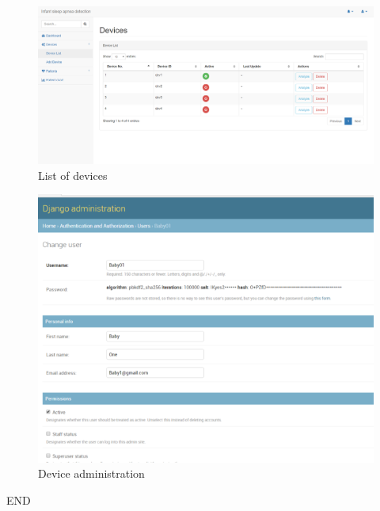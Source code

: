 \documentclass{article}
\begin{document}
\begin{figure}[h]
    \centering
    \includegraphics[scale=0.3]{listdevice.png}
    \caption{List of devices}
    \label{fig:List of devices}
\end{figure}

\begin{figure}[h]
    \centering
    \includegraphics{deviceAdmin.png}
    \caption{Device administration}
    \label{fig:Device administration}
\end{figure}
\clearpage
\LARGE \centering END
\end{document}
